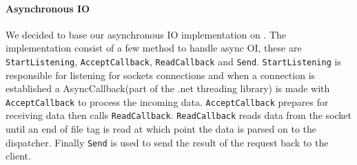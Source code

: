 \paragraph{Asynchronous IO}
\label{sec:asyncImplementation}
We decided to base our asynchronous IO implementation on \cite{asynh-imlp}. The implementation consist of a few method to handle async OI, these are \texttt{StartListening}, \texttt{AcceptCallback}, \texttt{ReadCallback} and \texttt{Send}. \texttt{StartListening} is responsible for listening for sockets connections and when a connection is established a AsyncCallback(part of the .net threading library) is made with \texttt{AcceptCallback} to process the incoming data. \texttt{AcceptCallback} prepares for receiving data then calls \texttt{ReadCallback}. \texttt{ReadCallback} reads data from the socket until an end of file tag is read at which point the data is parsed on to the dispatcher. Finally \texttt{Send} is used to send the result of the request back to the client.  %